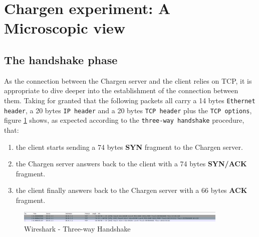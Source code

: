 \documentclass{exam}
\begin{document}
\section{Chargen experiment: A Microscopic view}
\subsection{The handshake phase}
As the connection between the Chargen server and the client relies on TCP, it is appropriate to dive deeper into the establishment of the connection between them. Taking for granted that the following packets all carry a 14 bytes \verb|Ethernet header|, a 20 bytes \verb|IP header| and a 20 bytes \verb|TCP header| plus the \verb|TCP options|, figure \ref{fig:wireshark-three-way_handshake} shows, as expected according to the \verb|three-way handshake| procedure, that:
\begin{enumerate}
    \item the client starts sending a 74 bytes \textbf{SYN} fragment to the Chargen server.
    \item the Chargen server answers back to the client with a 74 bytes \textbf{SYN/ACK} fragment.
    \item the client finally answers back to the Chargen server with a 66 bytes \textbf{ACK} fragment.
\end{enumerate}
\begin{figure}[H]
    \centering
    \includegraphics[width=0.90\textwidth]{three_way_handshake.png}
    \caption{Wireshark - Three-way Handshake}
    \label{fig:wireshark-three-way_handshake}
\end{figure}
\end{document}
